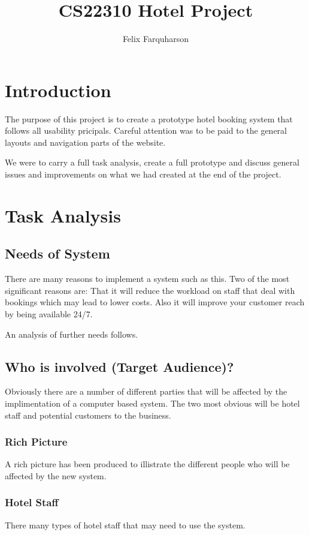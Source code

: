 \documentclass[12pt]{article}
\begin{document}
\title{CS22310 Hotel Project}
\author{Felix Farquharson}

\maketitle
\tableofcontents

\section{Introduction}
The purpose of this project is to create a prototype hotel booking system
that follows all usability pricipals. Careful attention was to be paid to
the general layouts and navigation parts of the website.

We were to carry a full task analysis, create a full prototype and discuss
general issues and improvements on what we had created at the end of the 
project.

\section{Task Analysis}
\subsection{Needs of System}
There are many reasons to implement a system such as this. Two of the most
significant reasons are: That it will reduce the workload on staff that 
deal with bookings which may lead to lower costs. Also it will improve 
your customer reach by being available 24/7.

An analysis of further needs follows.

\subsection{Who is involved (Target Audience)?}
Obviously there are a number of different parties that will be affected by
the implimentation of a computer based system. The two most obvious will be
hotel staff and potential customers to the business.
\subsubsection{Rich Picture}
A rich picture has been produced to illistrate the different people who will
be affected by the new system.



\subsubsection{Hotel Staff}
There many types of hotel staff that may need to use the system.
\end{document}
